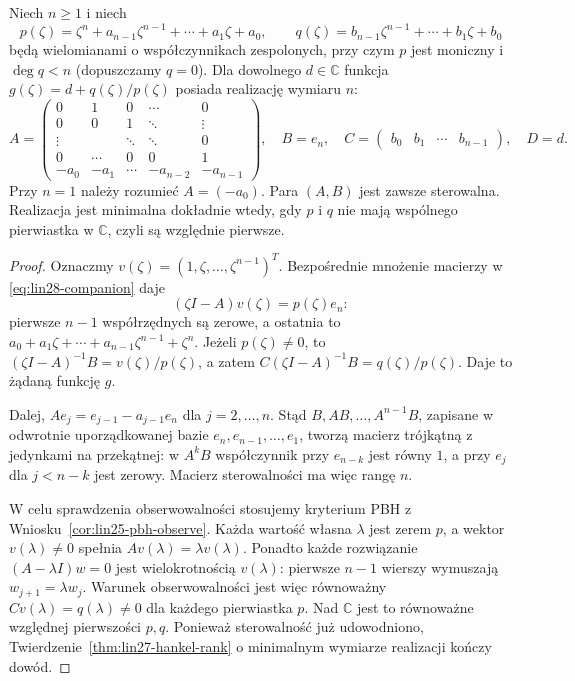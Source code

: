 \begin{twierdzenie}
\label{thm:lin28-companion}
Niech \(n\ge1\) i niech
\[
 p(\zeta)=\zeta^n+a_{n-1}\zeta^{n-1}
      +\cdots+a_1\zeta+a_0,\qquad
 q(\zeta)=b_{n-1}\zeta^{n-1}
      +\cdots+b_1\zeta+b_0
\]
będą wielomianami o współczynnikach zespolonych,
przy czym \(p\) jest moniczny i \(\deg q<n\)
(dopuszczamy \(q=0\)).
Dla dowolnego \(d\in\mathbb C\)
funkcja \(g(\zeta)=d+q(\zeta)/p(\zeta)\)
posiada realizację wymiaru \(n\):
\[
 A=\begin{pmatrix}
 0&1&0&\cdots&0\\
 0&0&1&\ddots&\vdots\\
 \vdots&&\ddots&\ddots&0\\
 0&\cdots&0&0&1\\
 -a_0&-a_1&\cdots&-a_{n-2}&-a_{n-1}
 \end{pmatrix},
 \quad B=e_n,\quad
 C=\begin{pmatrix}b_0&b_1&\cdots&b_{n-1}\end{pmatrix},
 \quad D=d.
 \tag{28.8}\label{eq:lin28-companion}
\]
Przy \(n=1\) należy rozumieć \(A=(-a_0)\).
Para \((A,B)\) jest zawsze sterowalna.
Realizacja jest minimalna dokładnie wtedy,
gdy \(p\) i \(q\) nie mają wspólnego pierwiastka
w \(\mathbb C\), czyli są względnie pierwsze.
\end{twierdzenie}
\begin{proof}
Oznaczmy \(v(\zeta)=(1,\zeta,\ldots,\zeta^{n-1})^T\).
Bezpośrednie mnożenie macierzy w
\eqref{eq:lin28-companion} daje
\[
 (\zeta I-A)v(\zeta)=p(\zeta)e_n:
\]
pierwsze \(n-1\) współrzędnych są zerowe,
a ostatnia to
\(a_0+a_1\zeta+\cdots+a_{n-1}\zeta^{n-1}+\zeta^n\).
Jeżeli \(p(\zeta)\ne0\), to
\((\zeta I-A)^{-1}B=v(\zeta)/p(\zeta)\),
a zatem \(C(\zeta I-A)^{-1}B=q(\zeta)/p(\zeta)\).
Daje to żądaną funkcję \(g\).

Dalej, \(Ae_j=e_{j-1}-a_{j-1}e_n\)
dla \(j=2,\ldots,n\). Stąd
\(B,AB,\ldots,A^{n-1}B\),
zapisane w odwrotnie uporządkowanej bazie
\(e_n,e_{n-1},\ldots,e_1\),
tworzą macierz trójkątną z jedynkami
na przekątnej: w \(A^kB\) współczynnik
przy \(e_{n-k}\) jest równy \(1\),
a przy \(e_j\) dla \(j<n-k\) jest zerowy.
Macierz sterowalności ma więc rangę \(n\).

W celu sprawdzenia obserwowalności
stosujemy kryterium PBH z
Wniosku~\ref{cor:lin25-pbh-observe}.
Każda wartość własna \(\lambda\) jest zerem
\(p\), a wektor \(v(\lambda)\ne0\)
spełnia \(Av(\lambda)=\lambda v(\lambda)\).
Ponadto każde rozwiązanie
\((A-\lambda I)w=0\) jest wielokrotnością
\(v(\lambda)\): pierwsze \(n-1\) wierszy
wymuszają \(w_{j+1}=\lambda w_j\).
Warunek obserwowalności jest więc równoważny
\(Cv(\lambda)=q(\lambda)\ne0\)
dla każdego pierwiastka \(p\).
Nad \(\mathbb C\) jest to równoważne
względnej pierwszości \(p,q\).
Ponieważ sterowalność już udowodniono,
Twierdzenie~\ref{thm:lin27-hankel-rank}
o minimalnym wymiarze realizacji
kończy dowód.
\end{proof}

